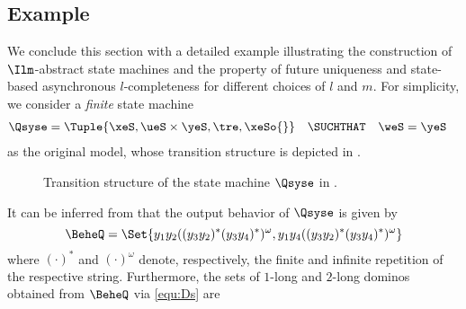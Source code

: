 \subsection{Example}\label{sec:SAlCA_new_exp}
We conclude this section with a detailed example illustrating the construction of $\Ilm$-abstract state machines and the property of future uniqueness and state-based asynchronous $l$-completeness for different choices of $l$ and $m$.
For simplicity, we consider a \emph{finite} state machine 
 \begin{align}
  \Qsyse&=\Tuple{\xeS,\ueS\times\yeS,\tre,\xeSo{}}\quad\SUCHTHAT\quad \weS=\yeS \label{equ:example:Qsyse}\end{align}
 as the original model, whose transition structure is depicted in .\begin{figure}
  \begin{center}
   \end{center}
  \caption{Transition structure of the state machine $\Qsyse$ in .}\label{fig:exp_Qsyse}
 \end{figure}
It can be inferred from  that the output behavior of $\Qsyse$ is given by
  \begin{equation*}
   \BeheQ=\Set{y_1y_2((y_3y_2)^*(y_3y_4)^*)^\omega,y_1y_4((y_3y_2)^*(y_3y_4)^*)^\omega}
  \end{equation*}
  where $(\cdot)^*$ and $(\cdot)^\omega$ denote, respectively, the finite and infinite repetition of the respective string. Furthermore, the sets of $1$-long and $2$-long dominos obtained from $\BeheQ$ via \eqref{equ:Ds} are
